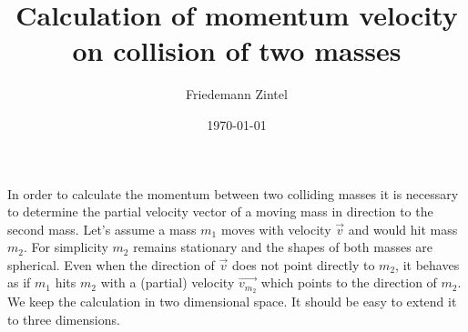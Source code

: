 \documentclass[a4paper]{article}
\title{Calculation of momentum velocity on collision of two masses}
\author{Friedemann Zintel}
\date{\today}
\begin{document}
\maketitle

In order to calculate the momentum between two colliding masses it is necessary to determine the partial velocity vector of a moving mass in direction to the second mass.
Let's assume a mass $m_1$ moves with velocity $\vec{v}$ and would hit mass $m_2$. For simplicity $m_2$ remains stationary and the shapes of both masses are spherical.
Even when the direction of $\vec{v}$ does not point directly to $m_2$, it behaves as if $m_1$ hits $m_2$ with a (partial) velocity $\vec{v_{m_2}}$ which points to the
direction of $m_2$. We keep the calculation in two dimensional space. It should be easy to extend it to three dimensions.
\end{document}
